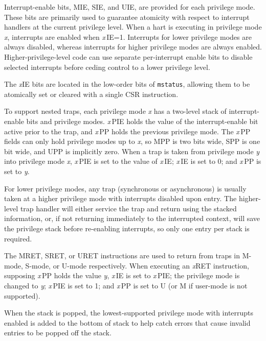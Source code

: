 Interrupt-enable bits, MIE, SIE, and UIE, are provided for each privilege
mode.  These bits are primarily used to guarantee atomicity with respect to
interrupt handlers at the current privilege level.  When a hart is executing
in privilege mode {\em x}, interrupts are enabled when {\em x}\,IE=1.
Interrupts for lower privilege modes are always disabled, whereas interrupts
for higher privilege modes are always enabled.  Higher-privilege-level code
can use separate per-interrupt enable bits to disable selected interrupts
before ceding control to a lower privilege level.

\begin{commentary}
The {\em x}IE bits are located in the low-order bits of {\tt mstatus},
allowing them to be atomically set or cleared with a single CSR
instruction.
\end{commentary}

To support nested traps, each privilege mode {\em x} has a two-level
stack of interrupt-enable bits and privilege modes.  {\em x}\,PIE
holds the value of the interrupt-enable bit active prior to the trap,
and {\em x}\,PP holds the previous privilege mode.  The {\em x}\,PP
fields can only hold privilege modes up to {\em x}, so MPP is
two bits wide, SPP is one bit wide, and UPP is implicitly zero.  When
a trap is taken from privilege mode {\em y} into privilege mode {\em
  x}, {\em x}\,PIE is set to the value of {\em x}\,IE; {\em x}\,IE is set to
0; and {\em x}\,PP is set to {\em y}.

\begin{commentary}
For lower privilege modes, any trap (synchronous or asynchronous) is
usually taken at a higher privilege mode with interrupts disabled upon entry.
The higher-level trap handler will either service the trap and return
using the stacked information, or, if not returning immediately to the
interrupted context, will save the privilege stack before re-enabling
interrupts, so only one entry per stack is required.
\end{commentary}

The MRET, SRET, or URET instructions are used to return from
traps in M-mode, S-mode, or U-mode respectively.  When
executing an {\em x}RET instruction, supposing {\em x}\,PP holds the
value {\em y}, {\em x}\,IE is set to {\em x}\,PIE; the privilege mode
is changed to {\em y}; {\em x}\,PIE is set to 1; and {\em x}\,PP is
set to U (or M if user-mode is not supported).

\begin{commentary}
When the stack is popped, the lowest-supported privilege mode with
interrupts enabled is added to the bottom of stack to help catch
errors that cause invalid entries to be popped off the stack.
\end{commentary}


